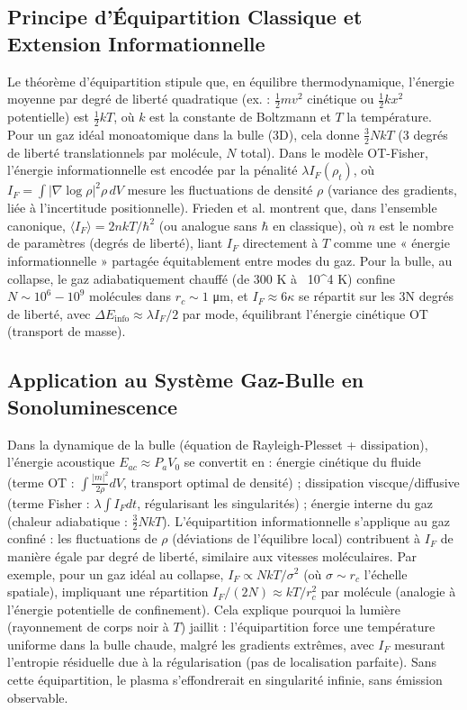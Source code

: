 \documentclass[a4paper,12pt]{article}
\begin{document}
\subsection{Principe d'Équipartition Classique et Extension Informationnelle}
Le théorème d'équipartition stipule que, en équilibre thermodynamique, l'énergie moyenne par degré de liberté quadratique (ex. : \( \frac{1}{2} m v^2 \) cinétique ou \( \frac{1}{2} k x^2 \) potentielle) est \( \frac{1}{2} k T \), où \( k \) est la constante de Boltzmann et \( T \) la température. Pour un gaz idéal monoatomique dans la bulle (3D), cela donne \( \frac{3}{2} N k T \) (3 degrés de liberté translationnels par molécule, \( N \) total). Dans le modèle OT-Fisher, l'énergie informationnelle est encodée par la pénalité \( \lambda I_F(\rho_t) \), où \( I_F = \int \vert \nabla \log \rho \vert^2 \rho \, dV \) mesure les fluctuations de densité \( \rho \) (variance des gradients, liée à l'incertitude positionnelle). Frieden et al. montrent que, dans l'ensemble canonique, \( \langle I_F \rangle = 2 n k T / \hbar^2 \) (ou analogue sans \( \hbar \) en classique), où \( n \) est le nombre de paramètres (degrés de liberté), liant \( I_F \) directement à \( T \) comme une « énergie informationnelle » partagée équitablement entre modes du gaz. Pour la bulle, au collapse, le gaz adiabatiquement chauffé (de 300 K à ~10^4 K) confine \( N \sim 10^6 - 10^9 \) molécules dans \( r_c \sim 1 \) μm, et \( I_F \approx 6 \kappa \) se répartit sur les 3N degrés de liberté, avec \( \Delta E_{\text{info}} \approx \lambda I_F / 2 \) par mode, équilibrant l'énergie cinétique OT (transport de masse).
\subsection{Application au Système Gaz-Bulle en Sonoluminescence}
Dans la dynamique de la bulle (équation de Rayleigh-Plesset + dissipation), l'énergie acoustique \( E_{ac} \approx P_a V_0 \) se convertit en : énergie cinétique du fluide (terme OT : \( \int \frac{\vert m \vert^2}{2 \rho} dV \), transport optimal de densité) ; dissipation viscque/diffusive (terme Fisher : \( \lambda \int I_F dt \), régularisant les singularités) ; énergie interne du gaz (chaleur adiabatique : \( \frac{3}{2} N k T \)). L'équipartition informationnelle s'applique au gaz confiné : les fluctuations de \( \rho \) (déviations de l'équilibre local) contribuent à \( I_F \) de manière égale par degré de liberté, similaire aux vitesses moléculaires. Par exemple, pour un gaz idéal au collapse, \( I_F \propto N k T / \sigma^2 \) (où \( \sigma \sim r_c \) l'échelle spatiale), impliquant une répartition \( I_F / (2 N) \approx k T / r_c^2 \) par molécule (analogie à l'énergie potentielle de confinement). Cela explique pourquoi la lumière (rayonnement de corps noir à \( T \)) jaillit : l'équipartition force une température uniforme dans la bulle chaude, malgré les gradients extrêmes, avec \( I_F \) mesurant l'entropie résiduelle due à la régularisation (pas de localisation parfaite). Sans cette équipartition, le plasma s'effondrerait en singularité infinie, sans émission observable.
\end{document}
